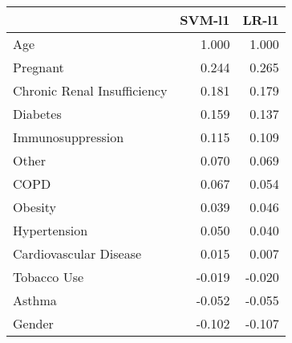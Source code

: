 \begin{tabular}{lrr}
\toprule
{} &  SVM-l1 &  LR-l1 \\
\midrule
Age                         &   1.000 &  1.000 \\
Pregnant                    &   0.244 &  0.265 \\
Chronic Renal Insufficiency &   0.181 &  0.179 \\
Diabetes                    &   0.159 &  0.137 \\
Immunosuppression           &   0.115 &  0.109 \\
Other                       &   0.070 &  0.069 \\
COPD                        &   0.067 &  0.054 \\
Obesity                     &   0.039 &  0.046 \\
Hypertension                &   0.050 &  0.040 \\
Cardiovascular Disease      &   0.015 &  0.007 \\
Tobacco Use                 &  -0.019 & -0.020 \\
Asthma                      &  -0.052 & -0.055 \\
Gender                      &  -0.102 & -0.107 \\
\bottomrule
\end{tabular}
